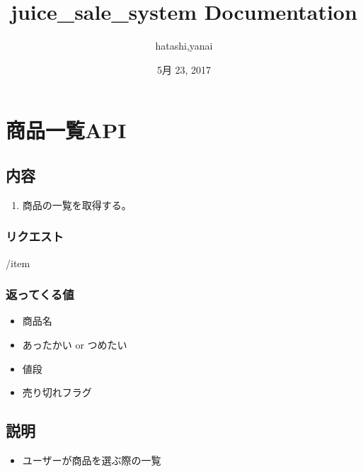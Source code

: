\documentclass[letterpaper,10pt,dvipdfmx]{sphinxmanual}
\title{juice\_sale\_system Documentation}
\date{5月 23, 2017}
\author{hatashi,yanai}
\begin{document}
\maketitle
\sphinxtableofcontents
{}\label{\detokenize{index::doc}}



\chapter{商品一覧API}
\label{\detokenize{user/index:api}}\label{\detokenize{user/index::doc}}\label{\detokenize{user/index:welcome-to-juice-sale-system-s-documentation}}

\section{内容}
\label{\detokenize{user/index:id1}}\begin{enumerate}
\item {} 
商品の一覧を取得する。

\end{enumerate}


\subsection{リクエスト}
\label{\detokenize{user/index:id2}}
/item


\subsection{返ってくる値}
\label{\detokenize{user/index:id3}}\begin{itemize}
\item {} 
商品名

\item {} 
あったかい or つめたい

\item {} 
値段

\item {} 
売り切れフラグ

\end{itemize}


\section{説明}
\label{\detokenize{user/index:id4}}\begin{itemize}
\item {} 
ユーザーが商品を選ぶ際の一覧

\end{itemize}
\end{document}
